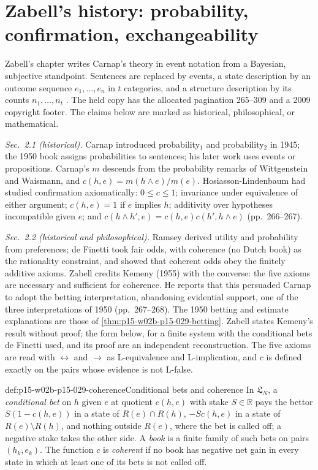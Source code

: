 \section{Zabell's history: probability, confirmation, exchangeability}
\label{sec:p15-w02b-p15-029-zabell}

Zabell's chapter writes Carnap's theory in event notation from a
Bayesian, subjective standpoint. Sentences are replaced by events, a
state description by an outcome sequence \(e_1,\ldots,e_n\) in
\(t\) categories, and a structure description by its counts
\(n_1,\ldots,n_t\) \cite[secs.~1, 4.2, pp.~265, 272]{Zabell2011CarnapInductiveInference}.
The held copy has the allocated pagination 265--309 and a 2009
copyright footer. The claims below are marked as historical,
philosophical, or mathematical.

\emph{Sec.~2.1 (historical).} Carnap introduced probability\(_1\) and
probability\(_2\) in 1945; the 1950 book assigns probabilities to
sentences; his later work uses events or propositions. Carnap's \(m\)
descends from the probability remarks of Wittgenstein and Waismann, and
\(c(h,e)=m(h\land e)/m(e)\). Hosiasson-Lindenbaum had studied
confirmation axiomatically: \(0\leq c\leq1\); invariance under
equivalence of either argument; \(c(h,e)=1\) if \(e\) implies \(h\);
additivity over hypotheses incompatible given \(e\); and
\(c(h\land h',e)=c(h,e)c(h',h\land e)\) (pp.~266--267).

\emph{Sec.~2.2 (historical and philosophical).} Ramsey derived utility
and probability from preferences; de Finetti took fair odds, with
coherence (no Dutch book) as the rationality constraint, and showed
that coherent odds obey the finitely additive axioms. Zabell credits
Kemeny (1955) with the converse: the five axioms are necessary and
sufficient for coherence. He reports that this persuaded Carnap to
adopt the betting interpretation, abandoning evidential support, one
of the three interpretations of 1950 (pp.~267--268). The 1950 betting
and estimate explanations are those of
\cref{thm:p15-w02b-p15-029-betting}. Zabell states Kemeny's result
without proof; the form below, for a finite system with the conditional
bets de Finetti used, and its proof are an independent reconstruction.
The five axioms are read with \(\leftrightarrow\) and \(\to\) as
L-equivalence and L-implication, and \(c\) is defined exactly on the
pairs whose evidence is not L-false.

\begin{hbdefinition}{def:p15-w02b-p15-029-coherence}{Conditional bets and coherence}
In \(\mathfrak L_N\), a \emph{conditional bet} on \(h\) given \(e\) at
quotient \(c(h,e)\) with stake \(S\in\mathbb R\) pays the bettor
\(S(1-c(h,e))\) in a state of \(R(e)\cap R(h)\), \(-Sc(h,e)\) in a
state of \(R(e)\setminus R(h)\), and nothing outside \(R(e)\), where the
bet is called off; a negative stake takes the other side. A \emph{book}
is a finite family of such bets on pairs \((h_k,e_k)\). The function
\(c\) is \emph{coherent} if no book has negative net gain in every
state in which at least one of its bets is not called off.
\end{hbdefinition}

